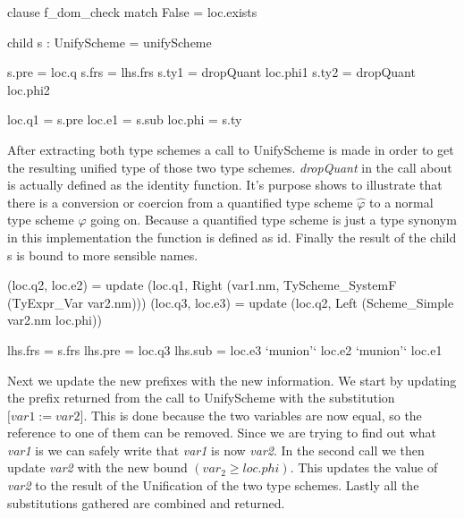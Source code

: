 \begin{code}
                                 clause f_dom_check
                                   match False = loc.exists
                                   
                                   child s : UnifyScheme = unifyScheme
                                   
                                   s.pre = loc.q
                                   s.frs = lhs.frs
                                   s.ty1 = dropQuant loc.phi1
                                   s.ty2 = dropQuant loc.phi2
                                   
                                   loc.q1  = s.pre
                                   loc.e1  = s.sub
                                   loc.phi = s.ty
\end{code}
After extracting both type schemes a call to UnifyScheme is made in order to get the resulting unified type of those two type schemes. \emph{dropQuant} in the call about is actually defined as the identity function. It's purpose shows to illustrate that there is a conversion or coercion from a quantified type scheme $\hat{\varphi}$ to a normal type scheme $\varphi$ going on. Because a quantified type scheme is just a type synonym in this implementation the function is defined as id. Finally the result of the child s is bound to more sensible names.

\begin{code}                            
                                   (loc.q2, loc.e2) = update (loc.q1, Right (var1.nm, TyScheme_SystemF (TyExpr_Var var2.nm)))
                                   (loc.q3, loc.e3) = update (loc.q2, Left (Scheme_Simple var2.nm loc.phi)) 
                                   
                                   lhs.frs = s.frs
                                   lhs.pre = loc.q3
                                   lhs.sub = loc.e3 `munion'` loc.e2 `munion'` loc.e1
\end{code}
Next we update the new prefixes with the new information. We start by updating the prefix returned from the call to UnifyScheme with the substitution $\lbrack var1 := var2 \rbrack$. This is done because the two variables are now equal, so the reference to one of them can be removed. Since we are trying to find out what \emph{var1} is we can safely write that \emph{var1} is now \emph{var2}. In the second call we then update \emph{var2} with the new bound $(var_2 \geq loc.phi)$. This updates the value of \emph{var2} to the result of the Unification of the two type schemes. Lastly all the substitutions gathered are combined and returned.

